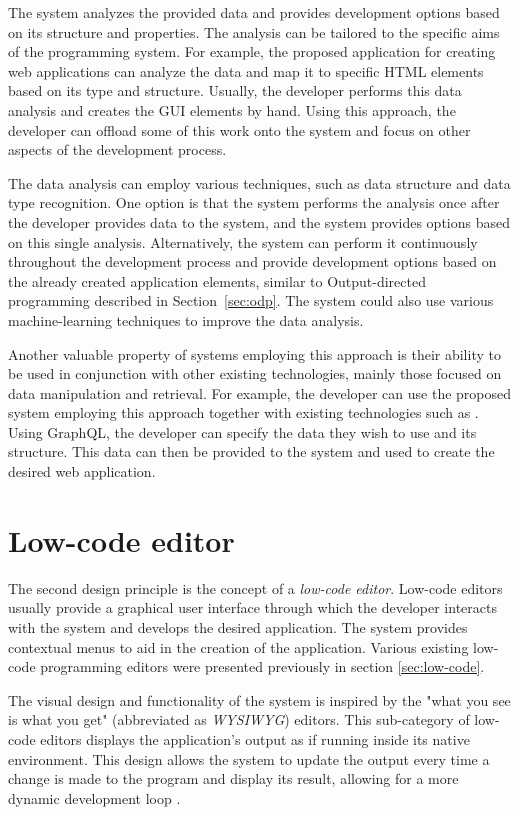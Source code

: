 The system analyzes the provided data and provides development options based on its structure and properties.
The analysis can be tailored to the specific aims of the programming system.
For example, the proposed application for creating web applications can analyze the data and map it to specific HTML elements based on its type and structure.
Usually, the developer performs this data analysis and creates the GUI elements by hand.
Using this approach, the developer can offload some of this work onto the system and focus on other aspects of the development process.

The data analysis can employ various techniques, such as data structure and data type recognition.
One option is that the system performs the analysis once after the developer provides data to the system, and the system provides options based on this single analysis.
Alternatively, the system can perform it continuously throughout the development process and provide development options based on the already created application elements, similar to Output-directed programming described in Section~\ref{sec:odp}.
The system could also use various machine-learning techniques to improve the data analysis.

Another valuable property of systems employing this approach is their ability to be used in conjunction with other existing technologies, mainly those focused on data manipulation and retrieval.
For example, the developer can use the proposed system employing this approach together with existing technologies such as \citet{graphql}.
Using GraphQL, the developer can specify the data they wish to use and its structure.
This data can then be provided to the system and used to create the desired web application.


\section{Low-code editor}

The second design principle is the concept of a \emph{low-code editor}.
Low-code editors usually provide a graphical user interface through which the developer interacts with the system and develops the desired application.
The system provides contextual menus to aid in the creation of the application.
Various existing low-code programming editors were presented previously in section \ref{sec:low-code}.

The visual design and functionality of the system is inspired by the "what you see is what you get" (abbreviated as \emph{WYSIWYG}) editors\cite{Yang_Gupta_Botev_Churchill_Levchenko_Shanmugasundaram_2008}.
This sub-category of low-code editors displays the application's output as if running inside its native environment.
This design allows the system to update the output every time a change is made to the program and display its result, allowing for a more dynamic development loop \cite{output-directed-programming}.

